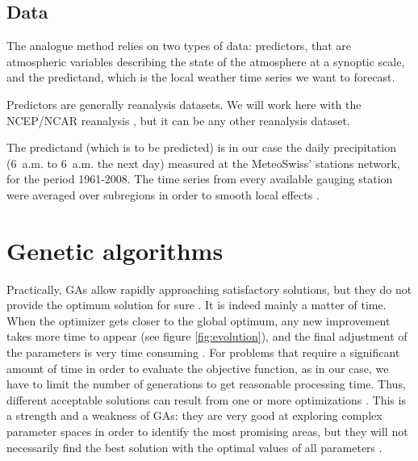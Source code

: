 \documentclass[twocol]{ametsoc}
\begin{document}
\subsection{Data}
\label{section_data}

The analogue method relies on two types of data: predictors, that are atmospheric variables describing the state of the atmosphere at a synoptic scale, and the predictand, which is the local weather time series we want to forecast.

Predictors are generally reanalysis datasets. We will work here with the NCEP/NCAR reanalysis \citep[6-hourly, 17 pressure levels at a resolution of 2.5\degree, see][]{Kalnay1996}, but it can be any other reanalysis dataset.

The predictand (which is to be predicted) is in our case the daily precipitation (6~a.m. to 6~a.m. the next day) measured at the MeteoSwiss' stations network, for the period 1961-2008. The time series from every available gauging station were averaged over subregions in order to smooth local effects \citep{Obled2002, Marty2012}.





\section{Genetic algorithms}



Practically, GAs allow rapidly approaching satisfactory solutions, but they do not provide the optimum solution for sure \citep{Zitzler2004a}. It is indeed mainly a matter of time. When the optimizer gets closer to the global optimum, any new improvement takes more time to appear (see figure \ref{fig:evolution}), and the final adjustment of the parameters is very time consuming \citep{Back1993a}. For problems that require a significant amount of time in order to evaluate the objective function, as in our case, we have to limit the number of generations to get reasonable processing time. Thus, different acceptable solutions can result from one or more optimizations \citep{Holland1992b}. This is a strength and a weakness of GAs: they are very good at exploring complex parameter spaces in order to identify the most promising areas, but they will not necessarily find the best solution with the optimal values of all parameters \citep{Holland1992b}.
\end{document}
